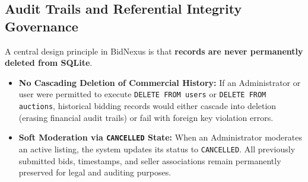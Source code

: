 \subsection{Audit Trails and Referential Integrity Governance}
A central design principle in BidNexus is that \textbf{records are never permanently deleted from SQLite}. 
\begin{itemize}
    \item \textbf{No Cascading Deletion of Commercial History:} If an Administrator or user were permitted to execute \texttt{DELETE FROM users} or \texttt{DELETE FROM auctions}, historical bidding records would either cascade into deletion (erasing financial audit trails) or fail with foreign key violation errors.
    \item \textbf{Soft Moderation via \texttt{CANCELLED} State:} When an Administrator moderates an active listing, the system updates its status to \texttt{CANCELLED}. All previously submitted bids, timestamps, and seller associations remain permanently preserved for legal and auditing purposes.
\end{itemize}

